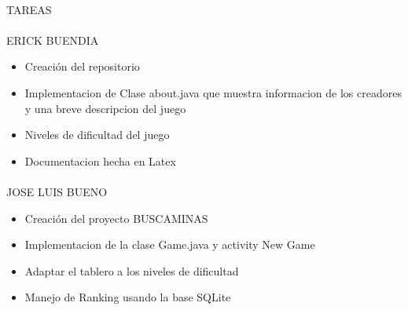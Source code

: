 \documentclass[../documentacion_buscaminas2013.tex]{subfiles}
\begin{document}
\paragraph{ }TAREAS

\paragraph{ } ERICK BUENDIA
\begin{itemize}
 \item Creación del repositorio
 \item Implementacion de Clase about.java que muestra informacion de los creadores y una breve descripcion del juego
 \item Niveles de dificultad del juego
 \item Documentacion hecha en Latex
\end{itemize}

\paragraph{ } JOSE LUIS BUENO
\begin{itemize}
 \item Creación del proyecto BUSCAMINAS
 \item Implementacion de la clase Game.java y activity New Game
 \item Adaptar el tablero a los niveles de dificultad
 \item Manejo de Ranking usando la base SQLite
\end{itemize}

\clearpage
\end{document}
